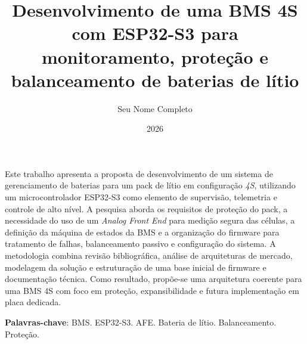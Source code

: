 \documentclass[
  12pt,
  oneside,
  openright,
  a4paper,
  english,
  brazil
]{abntex2}
\title{Desenvolvimento de uma BMS 4S com ESP32-S3 para monitoramento, proteção e balanceamento de baterias de lítio}
\author{Seu Nome Completo}
\date{2026}
\begin{document}
\frenchspacing

\pretextual

\imprimircapa
\imprimirfolhaderosto*



\begin{resumo}
Este trabalho apresenta a proposta de desenvolvimento de um sistema de gerenciamento de baterias
para um pack de lítio em configuração \textit{4S}, utilizando um microcontrolador ESP32-S3 como
elemento de supervisão, telemetria e controle de alto nível. A pesquisa aborda os requisitos de
proteção do pack, a necessidade do uso de um \textit{Analog Front End} para medição segura das
células, a definição da máquina de estados da BMS e a organização do firmware para tratamento de
falhas, balanceamento passivo e configuração do sistema. A metodologia combina revisão bibliográfica,
análise de arquiteturas de mercado, modelagem da solução e estruturação de uma base inicial de
firmware e documentação técnica. Como resultado, propõe-se uma arquitetura coerente para uma BMS
4S com foco em proteção, expansibilidade e futura implementação em placa dedicada.

\textbf{Palavras-chave}: BMS. ESP32-S3. AFE. Bateria de lítio. Balanceamento. Proteção.
\end{resumo}
\end{document}
